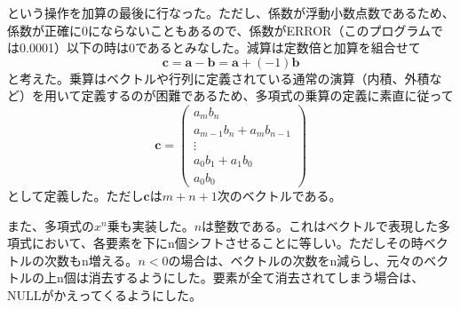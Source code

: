\documentclass{jsarticle}
\begin{document}
という操作を加算の最後に行なった。ただし、係数が浮動小数点数であるため、係数が正確に0にならないこともあるので、係数がERROR（このプログラムでは0.0001）以下の時は0であるとみなした。減算は定数倍と加算を組合せて
\begin{equation}
\bm{c} = \bm{a} - \bm{b} = \bm{a} + (-1)\bm{b}
\end{equation}
と考えた。乗算はベクトルや行列に定義されている通常の演算（内積、外積など）を用いて定義するのが困難であるため、多項式の乗算の定義に素直に従って
\begin{equation}
\bm{c} = 
\begin{pmatrix}
	a_m b_n \\
	a_{m-1} b_n + a_m b_{n-1} \\
	\vdots \\
	a_0 b_1 + a_1 b_0 \\
	a_0 b_0
\end{pmatrix}	
\end{equation}
として定義した。ただし$\bm{c}$は$m+n+1$次のベクトルである。

また、多項式の$x^n$乗も実装した。$n$は整数である。これはベクトルで表現した多項式において、各要素を下にn個シフトさせることに等しい。ただしその時ベクトルの次数もn増える。$n < 0$の場合は、ベクトルの次数をn減らし、元々のベクトルの上n個は消去するようにした。要素が全て消去されてしまう場合は、NULLがかえってくるようにした。
\end{document}
